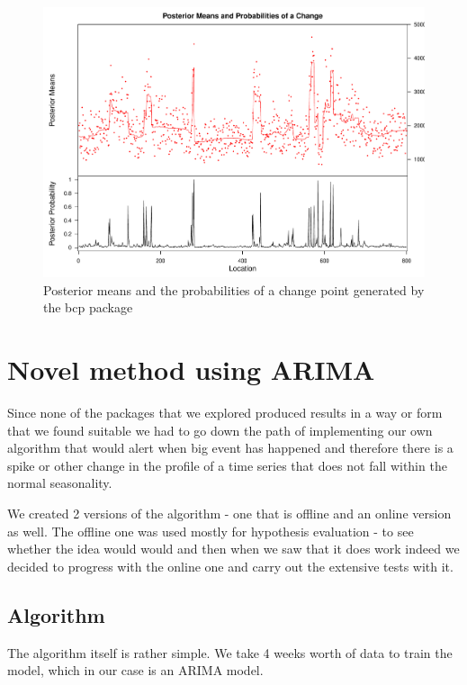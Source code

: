 \documentclass[minf,twoside,singlespacing,parskip,notimes,deptreport]{infthesis} %
\begin{document}
\begin{figure}[]
\begin{center}
\includegraphics[width=\textwidth]{bcp}
\end{center}
\caption{Posterior means and the probabilities of a change point generated by the bcp package}
\label{bcp}
\end{figure}


\section{Novel method using ARIMA}
\label{sec:novel}

Since none of the packages that we explored produced results in a way or form that we found suitable we had to go down the path of implementing our own algorithm that would alert when  big event has happened and therefore there is a spike or other change in the profile of a time series that does not fall within the normal seasonality. 

We created 2 versions of the algorithm - one that is offline and an online version as well. The offline one was used mostly for hypothesis evaluation - to see whether the idea would would and then when we saw that it does work indeed we decided to progress with the online one and carry out the extensive tests with it.


\subsection{Algorithm}

The algorithm itself is rather simple. We take 4 weeks worth of data to train the model, which in our case is an ARIMA model. 
\end{document}
